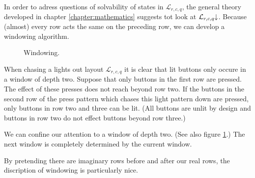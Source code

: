 In order to adress questions of solvability of states in $\mathcal{L}_{r,c,q}$,
the general theory developed in chapter \ref{chapter:mathematics} suggests tot
look at $\mathcal{L}_{r,c,q}\negthickspace\downarrow$. Because (almost) every row acts the same on
the preceding row, we can develop a windowing algorithm.
\begin{figure}
	\begin{center}
		\hspace*{\fill}
		\hfill
		\hspace*{\fill}
	\end{center}
	\caption{Windowing.}\label{figure:windowing}
\end{figure}

When chasing a lights out layout $\mathcal{L}_{r,c,q}$ it is clear that lit
buttons only occure in a window of depth two. Suppose that only buttons in the
first row are pressed. The effect of these presses does not reach beyond row
two. If the buttons in the second row of the press pattern which chases this
light pattern down are pressed, only buttons in row two and three can be lit.
(All buttons are unlit by design and buttons in row two do not effect buttons
beyond row three.)

We can confine our attention to a window of depth two. (See also figure
\ref{figure:windowing}.) The next window is completely determined by
the current window. 

By pretending there are imaginary rows before and after our real rows, the
discription of windowing is particularly nice.


